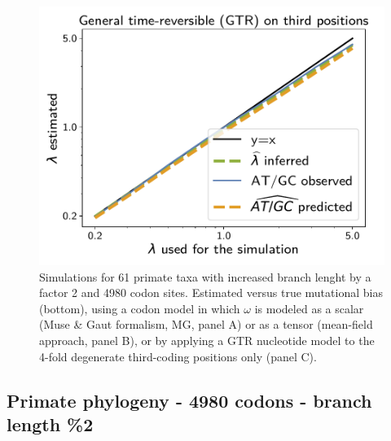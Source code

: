 \documentclass{article}
\begin{document}
\begin{figure}[!htb]
    \begin{minipage}{0.325\linewidth}
        \includegraphics[width=\linewidth, page=1]{inference_supp_mat/PrimatesExons10Mu2.0_lambda_GTR.pdf}
    \end{minipage}
    \hfill
    \caption[Estimation of mutational bias]{
        Simulations for 61 primate taxa with increased branch lenght by a factor 2 and 4980 codon sites.
        Estimated versus true mutational bias (bottom), using a codon model in which $\omega$ is modeled as a scalar (Muse \& Gaut formalism, MG, panel A) or as a tensor (mean-field approach, panel B), or by applying a GTR nucleotide model to the 4-fold degenerate third-coding positions only (panel C).
    }
\end{figure}

\subsection{Primate phylogeny - 4980 codons - branch length \%2}
\end{document}
